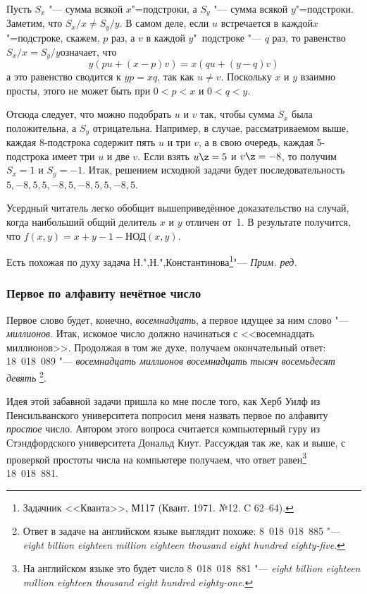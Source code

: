 \documentclass[twoside]{book}
\newenvironment{addedbytheeditors}{\par\medskip\small
}{\par\addvspace{\medskipamount}} %
\begin{document}
Пусть $S_x$ "--- сумма всякой $x$"=подстроки, а $S_y$ "---
сумма всякой $y$"=подстроки.
Заметим, что $S_x/x\ne S_y/y$.
В самом деле, если $u$ встречается в каждой$x$"=подстроке, скажем, $p$ раз, а $v$ в каждой $y$"~под\-строке "--- $q$ раз, то равенство $S_x/x=S_y/y$означает, что
\[y(pu+(x-p)v)=x(qu+(y-q)v)\]
а это равенство сводится к $yp=xq$, так как $u\ne v$.
Поскольку $x$ и $y$ взаимно просты, этого не может быть при $0<p<x$ и $0<q<y$.

Отсюда следует, что можно подобрать $u$ и $v$ так, чтобы сумма $S_x$ была положительна, а $S_y$ отрицательна.
Например, в случае, рассматриваемом выше, каждая 8-подстрока содержит пять $u$ и три $v$, 
а в свою очередь, каждая 5-подстрока имеет три $u$ и две $v$.
Если взять $u\z=5$ и $v\z=-8$, то получим $S_x=1$ и $S_y=-1$.
Итак, решением исходной задачи будет последовательность $5,-8,5,5,-8,5,-8,5,5,-8,5$.
\heart

\medskip
Усердный читатель легко обобщит вышеприведённое доказательство на случай, 
когда наибольший общий делитель $x$ и $y$ отличен от~1.
В результате получится, что $f(x,y)=x+y-1-\text{НОД}(x,y)$.

\begin{addedbytheeditors}
Есть похожая по духу задача Н.",Н.",Константинова\footnote{%
Задачник <<Кванта>>, М117 (Квант. 1971. №12. C 62--64).}"--- \emph{Прим. ред.}
\end{addedbytheeditors}


\subsubsection*{Первое по алфавиту нечётное число}

Первое слово будет, конечно, \emph{восемнадцать}, а первое идущее за ним слово "--- \emph{миллионов}.
Итак, искомое число должно начинаться с <<восемнадцать миллионов>>.
Продолжая в том же духе, получаем окончательный ответ: 18~018~089 "--- \emph{восемнадцать миллионов восемнадцать тысяч восемьдесят девять}%
\footnote{Ответ в задаче на английском языке выглядит похоже: 8~018~018~885 "--- \emph{eight billion eighteen million eighteen thousand eight hundred eighty-five}.}.
\heart

\medskip
Идея этой забавной задачи пришла ко мне после того, как Херб Уилф из Пенсильванского университета %
попросил меня назвать первое по алфавиту \emph{простое} число.
Автором этого вопроса считается компьютерный гуру из Стэндфордского университета Дональд Кнут. %
Рассуждая так же, как и выше, с проверкой простоты числа на компьютере
получаем, что ответ равен\footnote{На английском языке это будет число 8~018~018~881 "--- \emph{eight billion eighteen million eighteen thou\-sand eight hundred eighty-one}.
} 18~018~881.
\end{document}
